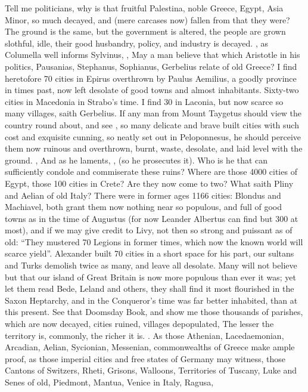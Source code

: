 Tell me politicians, why is that fruitful Palestina, noble Greece, Egypt, Asia
Minor, so much decayed, and (mere carcases now) fallen from that they were? The
ground is the same, but the government is altered, the people are grown
slothful, idle, their good husbandry, policy, and industry is decayed. , as Columella well informs
Sylvinus, , \etc{} May a man believe that which
Aristotle in his politics, Pausanias, Stephanus, Sophianus, Gerbelius relate of
old Greece? I find heretofore 70 cities in Epirus overthrown by Paulus
Aemilius, a goodly province in times past, now left
desolate of good towns and almost inhabitants. Sixty-two cities in Macedonia in
Strabo's time. I find 30 in Laconia, but now scarce so many villages, saith
Gerbelius. If any man from Mount Taygetus should view the country round about,
and see , so many
delicate and brave built cities with such cost and exquisite cunning, so neatly
set out in Peloponnesus, he should perceive them now
ruinous and overthrown, burnt, waste, desolate, and laid level with the ground.
, \etc{} And as he laments, , (so he prosecutes it).
Who is he that can sufficiently condole and commiserate
these ruins? Where are those 4000 cities of Egypt, those 100 cities in Crete?
Are they now come to two? What saith Pliny and Aelian of old Italy? There were
in former ages 1166 cities: Blondus and Machiavel, both grant them now nothing
near so populous, and full of good towns as in the time of Augustus (for now
Leander Albertus can find but 300 at most), and if we may give credit to
Livy, not then so strong and puissant as of old: \enquote{They
mustered 70 Legions in former times, which now the known world will scarce
yield}. Alexander built 70 cities in a short space for his part, our sultans
and Turks demolish twice as many, and leave all desolate. Many will not believe
but that our island of Great Britain is now more populous than ever it was; yet
let them read Bede, Leland and others, they shall find it most flourished in
the Saxon Heptarchy, and in the Conqueror's time was far better inhabited, than
at this present. See that Doomsday Book, and show me those thousands of
parishes, which are now decayed, cities ruined, villages depopulated, \etc{}
The lesser the territory is, commonly, the richer it is. . As those Athenian, Lacedaemonian, Arcadian, Aelian, Sycionian,
Messenian, \etc{} commonwealths of Greece make ample proof, as those imperial
cities and free states of Germany may witness, those Cantons of Switzers,
Rheti, Grisons, Walloons, Territories of Tuscany, Luke and Senes of old,
Piedmont, Mantua, Venice in Italy, Ragusa, \etc{}

